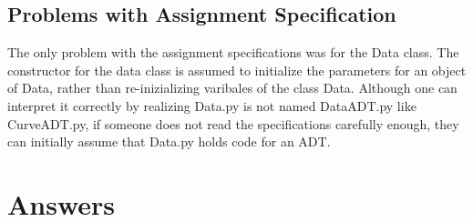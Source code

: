 \documentclass[12pt]{article}
\begin{document}
\subsection{Problems with Assignment Specification}
The only problem with the assignment specifications was for the Data class. The constructor for the data class is assumed to initialize the parameters for an object of Data, rather than re-inizializing varibales of the class Data. Although one can interpret it correctly by realizing Data.py is not named DataADT.py like CurveADT.py, if someone does not read the specifications carefully enough, they can initially assume that Data.py holds code for an ADT. 

\section{Answers}
\end{document}
